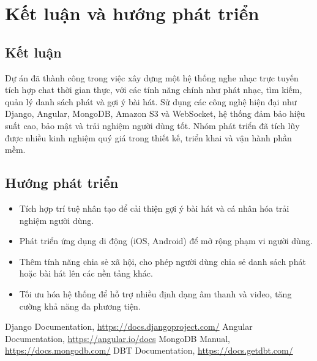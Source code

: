 \documentclass[a4paper,12pt]{report}
\begin{document}
\chapter{Kết luận và hướng phát triển}

\section{Kết luận}
Dự án đã thành công trong việc xây dựng một hệ thống nghe nhạc trực tuyến tích hợp chat thời gian thực, với các tính năng chính như phát nhạc, tìm kiếm, quản lý danh sách phát và gợi ý bài hát. Sử dụng các công nghệ hiện đại như Django, Angular, MongoDB, Amazon S3 và WebSocket, hệ thống đảm bảo hiệu suất cao, bảo mật và trải nghiệm người dùng tốt. Nhóm phát triển đã tích lũy được nhiều kinh nghiệm quý giá trong thiết kế, triển khai và vận hành phần mềm.

\section{Hướng phát triển}
\begin{itemize}
    \item Tích hợp trí tuệ nhân tạo để cải thiện gợi ý bài hát và cá nhân hóa trải nghiệm người dùng.
    \item Phát triển ứng dụng di động (iOS, Android) để mở rộng phạm vi người dùng.
    \item Thêm tính năng chia sẻ xã hội, cho phép người dùng chia sẻ danh sách phát hoặc bài hát lên các nền tảng khác.
    \item Tối ưu hóa hệ thống để hỗ trợ nhiều định dạng âm thanh và video, tăng cường khả năng đa phương tiện.
\end{itemize}

\begin{thebibliography}{9}
     Django Documentation, \url{https://docs.djangoproject.com/}
     Angular Documentation, \url{https://angular.io/docs}
     MongoDB Manual, \url{https://docs.mongodb.com/}
     DBT Documentation, \url{https://docs.getdbt.com/}
\end{thebibliography}
\end{document}
